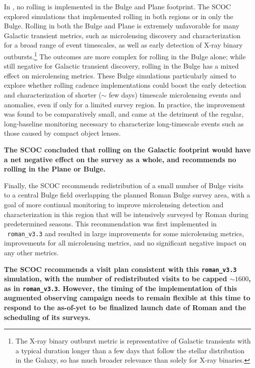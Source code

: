 In , no rolling is implemented in the Bulge and Plane footprint. The SCOC explored simulations that implemented rolling in both regions or in only the Bulge.
Rolling in both the Bulge and Plane is extremely unfavorable for many Galactic transient metrics, such as microlensing discovery and characterization for a broad range of event timescales, as well as early detection of X-ray binary outbursts.\footnote{The X-ray binary outburst metric is representative of Galactic transients with a typical duration longer than a few days that follow the stellar distribution in the Galaxy, so has much broader relevance than solely for X-ray binaries.} The outcomes are more complex for rolling in the Bulge alone; while still negative for Galactic transient discovery, rolling in the Bulge has a mixed effect on microlensing metrics. These Bulge simulations particularly aimed to explore whether rolling cadence implementations could boost the early detection and characterization of shorter ($\sim$ few days) timescale microlensing events and anomalies, even if only for a limited survey region. In practice, the improvement was found to be comparatively small, and came at the detriment of the regular, long-baseline monitoring necessary to characterize long-timescale events such as those caused by compact object lenses.   


{\bf The SCOC concluded that rolling on the Galactic footprint would have a net negative effect on the survey as a whole, and recommends no rolling in the Plane or Bulge.}

Finally, the SCOC recommends redistribution of a small number of Bulge visits to 
a central Bulge field overlapping the planned Roman Bulge survey area, with a goal of more continual monitoring to improve microlensing detection and characterization in this region that will be intensively surveyed by Roman during predetermined seasons.
This recommendation was first implemented in \opsim\ \texttt{roman\_v3.3} and resulted in large improvements for some microlensing metrics, improvements for all microlensing metrics, and no significant negative impact on any other metrics. 

{\bf The SCOC recommends a visit plan consistent with this \texttt{roman\_v3.3} simulation, with the number of redistributed visits to be capped $\sim1600$, as in  \texttt{roman\_v3.3}. However, the timing of the implementation of this augmented observing campaign needs to remain flexible at this time to respond to the as-of-yet to be finalized launch date of Roman and the scheduling of its surveys.}


